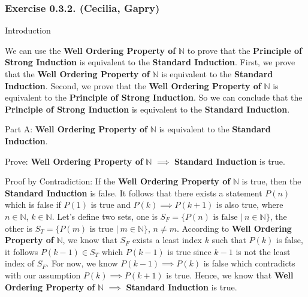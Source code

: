 \subsubsection*{Exercise 0.3.2. (Cecilia, Gapry)}

\begin{flushleft}
Introduction \\
\vspace{10px}

We can use the \textbf{Well Ordering Property of} $\mathbb{N}$ to prove that 
the \textbf{Principle of Strong Induction} is equivalent to the 
\textbf{Standard Induction}. First, we prove that the \textbf{Well Ordering 
Property of} $\mathbb{N}$ is equivalent to the \textbf{Standard Induction}.  
Second, we prove that the \textbf{Well Ordering Property of} $\mathbb{N}$ is 
equivalent to the \textbf{Principle of Strong Induction}. So we can conclude 
that the \textbf{Principle of Strong Induction} is equivalent to the 
\textbf{Standard Induction}.
\end{flushleft}

\begin{flushleft}
Part A: \textbf{Well Ordering Property of} $\mathbb{N}$ is equivalent to the 
\textbf{Standard Induction}. \\
\vspace{10px}

Prove: \textbf{Well Ordering Property of} $\mathbb{N}$ $\implies$ 
\textbf{Standard Induction} is true. \\
\vspace{10px}

Proof by Contradiction: If the \textbf{Well Ordering Property of} $\mathbb{N}$ 
is true, then the \textbf{Standard Induction} is false. It follows that there 
exists a statement $P(n)$ which is false if $P(1)$ is true and $P(k) \implies 
P(k + 1)$ is also true, where $n \in \mathbb{N}$, $k \in \mathbb{N}$. Let's 
define two sets, one is $S_F = \{ P(n) \text{ is false } |\ n \in \mathbb{N} 
\}$, the other is $S_T = \{ P(m) \text{ is true } |\ m \in \mathbb{N} \}$, 
$n \ne m$. According to \textbf{Well Ordering Property of} $\mathbb{N}$, we
know that $S_F$ exists a least index $k$ such that $P(k)$ is false, it follows 
$P(k - 1) \in S_T$ which $P(k - 1)$ is true since $k - 1$ is not the least 
index of $S_F$. For now, we know $P(k - 1) \implies P(k)$ is false which  
contradicts with our assumption $P(k) \implies P(k + 1)$ is true. Hence, we 
know that \textbf{Well Ordering Property of} $\mathbb{N}$ $\implies$ 
\textbf{Standard Induction} is true.
\end{flushleft}

